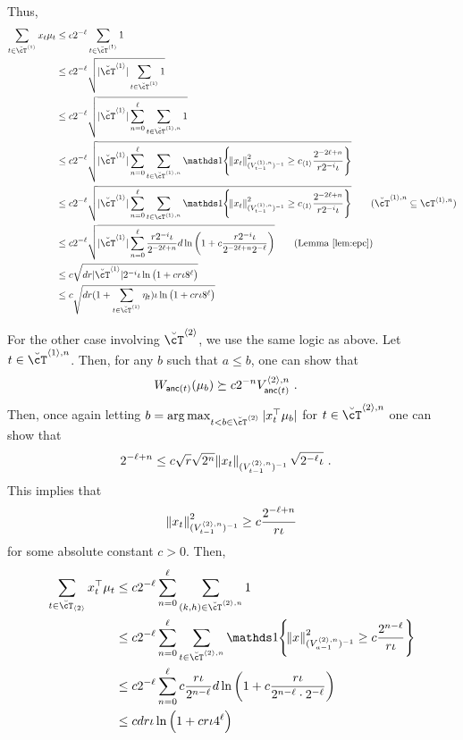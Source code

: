 Thus,
\begin{align*}
  \sum_{t\in \brcT^{\la1\ra}} x_{t}\mu_{t}
  &\le   c2^{-\ell} \sum_{t\in \brcT^{\la1\ra}} 1
  \\&\le c2^{-\ell} \sqrt{|\brcT^{\la1\ra}| \sum_{t\in \brcT^{\la1\ra}} 1}
  \\&\le c2^{-\ell} \sqrt{|\brcT^{\la1\ra}| \sum_{n=0}^{\ell} \sum_{t\in \brcT^{\la1\ra,n}} 1}
  \\&\le c2^{-\ell} \sqrt{|\brcT^{\la1\ra}| \sum_{n=0}^{\ell} \sum_{t\in \brcT^{\la1\ra,n}} \onec{\norm{x_t }_{(V^{\la1\ra,n}_{t-1})^{-1}}^2 \ge c_{\la1\ra}\fr{2^{-2\ell+n}}{r 2^{-i}\iota }} } 
  \\&\le c2^{-\ell} \sqrt{|\brcT^{\la1\ra}| \sum_{n=0}^{\ell} \sum_{t\in \cT^{\la1\ra,n}} \onec{\norm{x_t }_{(V^{\la1\ra,n}_{t-1})^{-1}}^2 \ge c_{\la1\ra}\fr{2^{-2\ell+n}}{r 2^{-i}\iota }} } \tag{$\brcT^{\la1\ra,n} \subseteq \cT^{\la1\ra,n}$}
  \\&\le c2^{-\ell} \sqrt{|\brcT^{\la1\ra}| \sum_{n=0}^{\ell} \fr{r 2^{-i} \iota}{2^{-2\ell + n} } d \ln\del{ 1 + c\fr{r 2^{-i}\iota}{2^{-2\ell+n} 2^{-\ell} }  }  }  \tag{Lemma~\ref{lem:epc}}
  \\&\le c\sqrt{dr |\brcT^{\la1\ra}| 2^{-i} \iota \ln\del{ 1 + c r \iota 8^{\ell}  }  } 
  \\&\le c \sqrt{dr (1 + \sum_{t\in \brcT^{\la1\ra}} \eta_t ) \iota \ln\del{ 1 + c r \iota 8^{\ell}  }  } 
\end{align*}


For the other case involving $\brcT^{\la2\ra}$, we use the same logic as above.
Let $t \in \brcT^{\la1\ra,n}$.
Then, for any $b$ such that $a \le b$, one can show that
\begin{align*}
  W_{\operatorname{\mathsf{anc}}(t)}(\mu_b)
  &\succeq c2^{-n} V^{{\langle}2{\rangle},n}_{\operatorname{\mathsf{anc}}(t)}~.
\end{align*}
Then, once again letting $b = \arg \max_{t<b\in \brcT^{\la2\ra} } |x_{t}^\top \mu_{b}|$ for $t\in\brcT^{\la2\ra,n}$ one can show that
\begin{align*}
  2^{-\ell + n} 
  &\le c\sqrt{r} \sqrt{2^n} \norm{x_{t}}_{(V^{{\langle}2{\rangle},n}_{t-1})^{-1}}  \sqrt{2^{-\ell}\iota} ~.
\end{align*}
This implies that
\begin{align*}
  \norm{x_t}_{(V^{{\langle}2{\rangle},n}_{t-1})^{-1}}^2  \ge c { \frac{2^{-\ell+n}}{r \iota} } 
\end{align*}
for some absolute constant $c>0$.
Then,
\begin{align*}
  \sum_{t\in \brcT_{\la2\ra}} x_t^\top\mu_t
  &\le   c2^{-\ell} \sum_{n=0}^{\ell} \sum_{(k,h)\in \brcT^{\la2\ra,n}} 1 
  \\&\le   c2^{-\ell} \sum_{n=0}^{\ell} \sum_{t\in \brcT^{\la2\ra,n}} \onec{\norm{x}^{2}_{(V^{\la2\ra,n}_{a-1})^{-1}} \ge c\fr{2^{n-\ell}}{r\iota} }
  \\&\le   c2^{-\ell} \sum_{n=0}^{\ell} c \fr{r\iota}{2^{n-\ell} }   d\ln\del{1+c\fr{r\iota}{2^{n-\ell}\cd 2^{-\ell} } }
  \\&\le   c d r \iota \ln\del{1 + c r \iota 4^\ell}
\end{align*}

